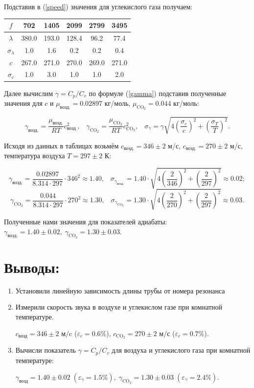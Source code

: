 \documentclass[a4paper,12pt]{article}
\begin{document}
\begin{enumerate}
Подставив в (\ref{speed}) значения для углекислого газа получаем:
\begin{center}
\begin{tabular}{|c|c|c|c|c|c|}
\hline
$ f $ & 702 & 1405 & 2099 & 2799 & 3495 \\
\hline
$ \lambda$ & 380.0 & 193.0 & 128.4 & 96.2 & 77.4 \\
\hline
$ \sigma_{\lambda}$ & 1.0 & 1.6 & 0.2 & 0.2 & 0.4 \\
\hline
$ c $ & 267.0 & 271.0 & 270.0 & 269.0 & 271.0 \\
\hline
$ \sigma_c $ & 1.0 & 3.0 & 1.0 & 1.0 & 2.0 \\
\hline
\end{tabular}
\end{center}

Далее вычислим $\gamma = C_p / C_v $ по формуле (\ref{gamma}) подставив полученные значения для $c$ и $\mu_{возд.} = 0.02897$ кг/моль, $ \mu_{\text{CO}_2} = 0.044 $ кг/моль:

\[
\gamma_{возд.} = \frac{\mu_{возд.}}{RT} c^2_{\text{возд.}}, \;\;\; \gamma_{\text{CO}_2} = \frac{\mu_{\text{CO}_2}}{RT} c^2_{\text{CO}_2}, \;\;\; \sigma_{\gamma} = \gamma \sqrt{4 \left(\frac{\sigma_c}{c} \right)^2 + \left(\frac{\sigma_T}{T} \right)^2}.
\]

\noindent Исходя из данных в таблицах возьмём $c_{\text{возд.}} = 346 \pm 2$ м/с,  $c_{\text{возд.}} = 270 \pm 2$ м/с, температура воздуха $T = 297 \pm 2$ К:

\[
\gamma_{\text{возд.}} = \frac{0.02897}{8.314 \cdot 297} \cdot 346^2 \approx 1.40 ,\;\;\;
\sigma_{\gamma_\text{возд.}} = 1.40 \cdot \sqrt{4 \left(\frac{2}{346} \right)^2 + \left(\frac{2}{297} \right)^2} \approx 0.02  ;
\]
\[
\gamma_{\text{CO}_2} = \frac{0.044}{8.314 \cdot 297} \cdot 270^2 \approx 1.30 ,\;\;\;
\sigma_{\gamma_{\text{CO}_2}} = 1.30 \cdot \sqrt{4 \left(\frac{2}{270} \right)^2 + \left(\frac{2}{297} \right)^2} \approx 0.03 .
\]

Полученные нами значения для показателей адиабаты: $ \gamma_{\text{возд.}} = 1.40 \pm 0.02, \; \gamma_{\text{CO}_2} = 1.30 \pm 0.03 $.
\end{enumerate}
\section{Выводы:}
\begin{enumerate}
\item
Установили линейную зависимость длины трубы от номера резонанса 
\item
Измерили скорость звука в воздухе и углекислом газе при комнатной температуре.

$c_{\text{возд}} = 346 \pm 2$ м$/$c ($\varepsilon_c = 0.6 \% $), $c_{\text{CO}_2} = 270 \pm 2$ м$/$с ($ \varepsilon_c = 0.7 \% $).

\item
Вычисли показатель $\gamma = C_p/C_v$ для воздуха и углекислого газа при комнатной температуре:

 $\gamma_{\text{возд}} = 1.40 \pm 0.02 \; (\varepsilon_\gamma = 1.5 \%), \; \gamma_{\text{CO}_2} = 1.30 \pm 0.03 \; (\varepsilon_\gamma = 2.4 \%)$.

\end{enumerate}
\end{document}
